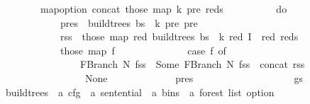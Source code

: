\begin{isabellebody}
\ \ \ \ \ \ \ \ map{\isacharunderscore}{\kern0pt}option\ concat\ {\isacharparenleft}{\kern0pt}those\ {\isacharparenleft}{\kern0pt}map\ {\isacharparenleft}{\kern0pt}{\isasymlambda}{\isacharparenleft}{\kern0pt}{\isacharparenleft}{\kern0pt}k{\isacharprime}{\kern0pt}{\isacharcomma}{\kern0pt}\ pre{\isacharparenright}{\kern0pt}{\isacharcomma}{\kern0pt}\ reds{\isacharparenright}{\kern0pt}{\isachardot}{\kern0pt}\isanewline
\ \ \ \ \ \ \ \ \ \ do\ {\isacharbraceleft}{\kern0pt}\isanewline
\ \ \ \ \ \ \ \ \ \ \ \ pres\ {\isasymleftarrow}\ build{\isacharunderscore}{\kern0pt}trees{\isacharprime}{\kern0pt}\ bs\ {\isasymomega}\ k{\isacharprime}{\kern0pt}\ pre\ {\isacharbraceleft}{\kern0pt}pre{\isacharbraceright}{\kern0pt}{\isacharsemicolon}{\kern0pt}\isanewline
\ \ \ \ \ \ \ \ \ \ \ \ rss\ {\isasymleftarrow}\ those\ {\isacharparenleft}{\kern0pt}map\ {\isacharparenleft}{\kern0pt}{\isasymlambda}red{\isachardot}{\kern0pt}\ build{\isacharunderscore}{\kern0pt}trees{\isacharprime}{\kern0pt}\ bs\ {\isasymomega}\ k\ red\ {\isacharparenleft}{\kern0pt}I\ {\isasymunion}\ {\isacharbraceleft}{\kern0pt}red{\isacharbraceright}{\kern0pt}{\isacharparenright}{\kern0pt}{\isacharparenright}{\kern0pt}\ reds{\isacharparenright}{\kern0pt}{\isacharsemicolon}{\kern0pt}\isanewline
\ \ \ \ \ \ \ \ \ \ \ \ those\ {\isacharparenleft}{\kern0pt}map\ {\isacharparenleft}{\kern0pt}{\isasymlambda}f{\isachardot}{\kern0pt}\isanewline
\ \ \ \ \ \ \ \ \ \ \ \ \ \ case\ f\ of\isanewline
\ \ \ \ \ \ \ \ \ \ \ \ \ \ \ \ FBranch\ N\ fss\ {\isasymRightarrow}\ Some\ {\isacharparenleft}{\kern0pt}FBranch\ N\ {\isacharparenleft}{\kern0pt}fss\ {\isacharat}{\kern0pt}\ {\isacharbrackleft}{\kern0pt}concat\ rss{\isacharbrackright}{\kern0pt}{\isacharparenright}{\kern0pt}{\isacharparenright}{\kern0pt}\isanewline
\ \ \ \ \ \ \ \ \ \ \ \ \ \ {\isacharbar}{\kern0pt}\ {\isacharunderscore}{\kern0pt}\ {\isasymRightarrow}\ None\isanewline
\ \ \ \ \ \ \ \ \ \ \ \ {\isacharparenright}{\kern0pt}\ pres{\isacharparenright}{\kern0pt}\isanewline
\ \ \ \ \ \ \ \ \ \ {\isacharbraceright}{\kern0pt}\isanewline
\ \ \ \ \ \ \ \ {\isacharparenright}{\kern0pt}\ gs{\isacharparenright}{\kern0pt}{\isacharparenright}{\kern0pt}\isanewline
\ \ \ \ \ \ {\isacharparenright}{\kern0pt}\isanewline
\ \ {\isacharparenright}{\kern0pt}{\isacharparenright}{\kern0pt}{\isachardoublequoteclose}\isanewline
\isanewline
{}\isamarkupfalse%
\ build{\isacharunderscore}{\kern0pt}trees\ {\isacharcolon}{\kern0pt}{\isacharcolon}{\kern0pt}\ {\isachardoublequoteopen}{\isacharprime}{\kern0pt}a\ cfg\ {\isasymRightarrow}\ {\isacharprime}{\kern0pt}a\ sentential\ {\isasymRightarrow}\ {\isacharprime}{\kern0pt}a\ bins\ {\isasymRightarrow}\ {\isacharprime}{\kern0pt}a\ forest\ list\ option{\isachardoublequoteclose}\ \isanewline

\end{isabellebody}
